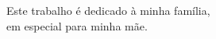 \begin{dedicatoria}
   \vspace*{\fill}
   \begin{flushright}
     Este trabalho é dedicado à minha família,\\
     em especial para minha mãe.
   \end{flushright}
   \vspace*{\fill}
\end{dedicatoria}
